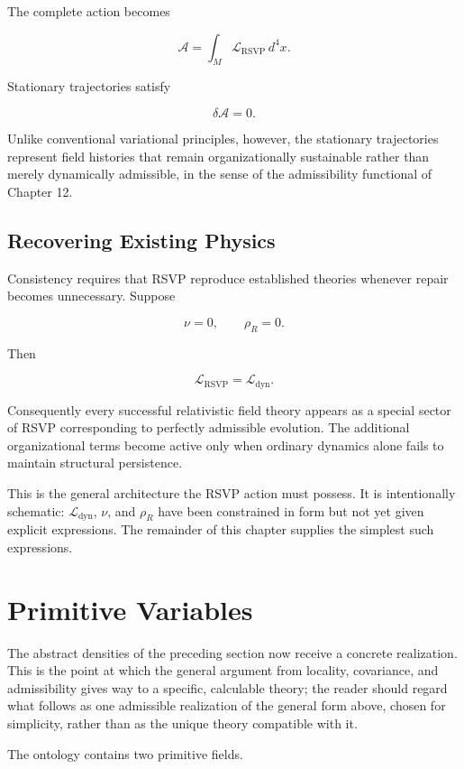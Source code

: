 \documentclass[11pt,oneside]{book}
\numberwithin{equation}{chapter}
\theoremstyle{definition}
\theoremstyle{plain}
\begin{document}
The complete action becomes

\[
\mathcal A
=
\int_M
\mathcal L_{\mathrm{RSVP}}
\,d^4x.
\]

Stationary trajectories satisfy

\[
\delta\mathcal A=0.
\]

Unlike conventional variational principles, however, the stationary
trajectories represent field histories that remain organizationally
sustainable rather than merely dynamically admissible, in the sense of the
admissibility functional of Chapter 12.

\subsection*{Recovering Existing Physics}

Consistency requires that RSVP reproduce established theories whenever
repair becomes unnecessary. Suppose

\[
\nu=0,
\qquad
\rho_R=0.
\]

Then

\[
\mathcal L_{\mathrm{RSVP}}
=
\mathcal L_{\mathrm{dyn}}.
\]

Consequently every successful relativistic field theory appears as a special
sector of RSVP corresponding to perfectly admissible evolution. The
additional organizational terms become active only when ordinary dynamics
alone fails to maintain structural persistence.

This is the general architecture the RSVP action must possess. It is
intentionally schematic: \(\mathcal L_{\mathrm{dyn}}\), \(\nu\), and
\(\rho_R\) have been constrained in form but not yet given explicit
expressions. The remainder of this chapter supplies the simplest such
expressions.

\section{Primitive Variables}

The abstract densities of the preceding section now receive a concrete
realization. This is the point at which the general argument from locality,
covariance, and admissibility gives way to a specific, calculable theory;
the reader should regard what follows as one admissible realization of the
general form above, chosen for simplicity, rather than as the unique
theory compatible with it.

The ontology contains two primitive fields.
\end{document}
